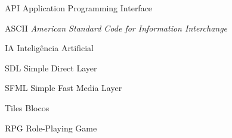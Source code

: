 \begin{siglas}
  \item[API] Application Programming Interface
  \item[ASCII] \textit{American Standard Code for Information Interchange}
  \item[IA] Inteligência Artificial
  \item[SDL] Simple Direct Layer
  \item[SFML] Simple Fast Media Layer
  \item[Tiles] Blocos
  \item[RPG] Role-Playing Game 

\end{siglas}
